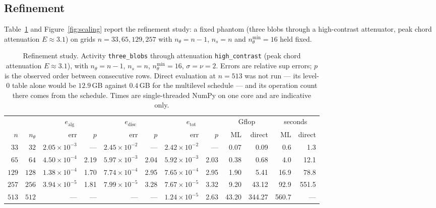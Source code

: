 \documentclass[11pt]{article}
\begin{document}
\subsection{Refinement}
\label{sec:refinement}

Table~\ref{tab:refine} and Figure~\ref{fig:scaling} report the refinement
study: a fixed phantom (three blobs through a high-contrast attenuator, peak
chord attenuation $E\approx3.1$) on grids $n=33,65,129,257$ with
$n_\theta=n-1$, $n_s=n$ and $n_\theta^{\min}=16$ held fixed.

\begin{table}[t]
\centering\small
\caption{Refinement study. Activity \texttt{three\_blobs} through attenuation
\texttt{high\_contrast} (peak chord attenuation $E\approx3.1$), with
$n_\theta=n-1$, $n_s=n$, $n_\theta^{\min}=16$, $\sigma=\nu=2$. Errors are
relative sup errors; $p$ is the observed order between consecutive rows.
Direct evaluation at $n=513$ was not run --- its level-0 table alone would be
$12.9$\,GB against $0.4$\,GB for the multilevel schedule --- and its operation
count there comes from the schedule. Times are single-threaded NumPy on one core and are indicative only.}
\label{tab:refine}
\begin{tabular}{rr rr rr rr rr rr}
\toprule
& & \multicolumn{2}{c}{$e_{\mathrm{alg}}$}
  & \multicolumn{2}{c}{$e_{\mathrm{disc}}$}
  & \multicolumn{2}{c}{$e_{\mathrm{tot}}$}
  & \multicolumn{2}{c}{Gflop}
  & \multicolumn{2}{c}{seconds}\\
\cmidrule(lr){3-4}\cmidrule(lr){5-6}\cmidrule(lr){7-8}\cmidrule(lr){9-10}\cmidrule(lr){11-12}
$n$ & $n_\theta$ & err & $p$ & err & $p$ & err & $p$
    & ML & direct & ML & direct\\
\midrule
$33$ & $32$ & $2.05\!\times\!10^{-3}$ & --- & $2.45\!\times\!10^{-2}$ & --- & $2.42\!\times\!10^{-2}$ & --- & 0.07 & 0.09 & 0.6 & 1.3 \\
$65$ & $64$ & $4.50\!\times\!10^{-4}$ & 2.19 & $5.97\!\times\!10^{-3}$ & 2.04 & $5.92\!\times\!10^{-3}$ & 2.03 & 0.38 & 0.68 & 4.0 & 12.1 \\
$129$ & $128$ & $1.38\!\times\!10^{-4}$ & 1.70 & $7.74\!\times\!10^{-4}$ & 2.95 & $7.65\!\times\!10^{-4}$ & 2.95 & 1.90 & 5.41 & 16.9 & 78.8 \\
$257$ & $256$ & $3.94\!\times\!10^{-5}$ & 1.81 & $7.99\!\times\!10^{-5}$ & 3.28 & $7.67\!\times\!10^{-5}$ & 3.32 & 9.20 & 43.12 & 92.9 & 551.5 \\
$513$ & $512$ & --- & --- & --- & --- & $1.24\!\times\!10^{-5}$ & 2.63 & 43.20 & 344.27 & 560.7 & --- \\
\bottomrule
\end{tabular}
\end{table}
\end{document}
